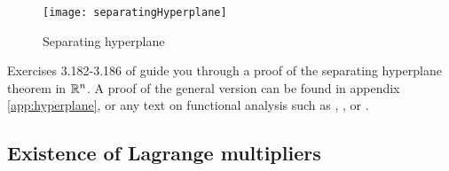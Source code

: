 \begin{figure}\caption{Separating hyperplane \label{fig:sht}}
  \begin{centering}
    \texttt{[image: separatingHyperplane]}
  \end{centering}
\end{figure}

Exercises 3.182-3.186 of \cite{carter2001} guide you through a proof
of the separating hyperplane theorem in $\mathbb{R}^n$. A proof of the general
version can be found in appendix \ref{app:hyperplane}, or any text on
functional analysis such as \cite{luenberger1969}, \cite{clarke2013},
or \cite{holmes1975}. 


\subsection{Existence of Lagrange multipliers}


